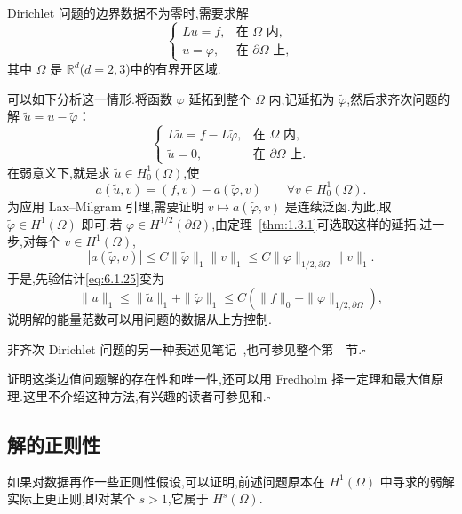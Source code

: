\begin{note}
Dirichlet 问题的边界数据不为零时,需要求解
\[
  \begin{cases}
    Lu=f,&\text{在 }\Omega\text{ 内},\\
    u=\varphi,&\text{在 }\partial\Omega\text{ 上},
  \end{cases}
\]
其中 \(\Omega\) 是 \(\mathbb R^d\)(\(d=2,3\))中的有界开区域.

可以如下分析这一情形.将函数 \(\varphi\) 延拓到整个 \(\Omega\) 内,记延拓为 \(\widetilde\varphi\),然后求齐次问题的解 \(\widetilde u=u-\widetilde\varphi\)：
\[
  \begin{cases}
    L\widetilde u=f-L\widetilde\varphi,&\text{在 }\Omega\text{ 内},\\
    \widetilde u=0,&\text{在 }\partial\Omega\text{ 上}.
  \end{cases}
\]
在弱意义下,就是求 \(\widetilde u\in H_0^1(\Omega)\),使
\[
  a(\widetilde u,v)=(f,v)-a(\widetilde\varphi,v)\qquad\forall v\in H_0^1(\Omega).
\]
为应用 Lax--Milgram 引理,需要证明 \(v\mapsto a(\widetilde\varphi,v)\) 是连续泛函.为此,取 \(\widetilde\varphi\in H^1(\Omega)\) 即可.若 \(\varphi\in H^{1/2}(\partial\Omega)\),由定理~\ref{thm:1.3.1}可选取这样的延拓.进一步,对每个 \(v\in H^1(\Omega)\),
\[
  |a(\widetilde\varphi,v)|\le C\|\widetilde\varphi\|_1\|v\|_1
  \le C\|\varphi\|_{1/2,\partial\Omega}\|v\|_1.
\]
于是,先验估计\eqref{eq:6.1.25}变为
\[
  \|u\|_1\le\|\widetilde u\|_1+\|\widetilde\varphi\|_1
   \le C(\|f\|_0+\|\varphi\|_{1/2,\partial\Omega}),
\]
说明解的能量范数可以用问题的数据从上方控制.

非齐次 Dirichlet 问题的另一种表述见笔记~,也可参见整个第~~节.\hfill\(\square\)
\end{note}

\begin{note}
证明这类边值问题解的存在性和唯一性,还可以用 Fredholm 择一定理和最大值原理.这里不介绍这种方法,有兴趣的读者可参见和.\hfill\(\square\)
\end{note}

\subsection{解的正则性}\label{sec:6.1.3}

如果对数据再作一些正则性假设,可以证明,前述问题原本在 \(H^1(\Omega)\) 中寻求的弱解实际上更正则,即对某个 \(s>1\),它属于 \(H^s(\Omega)\).

